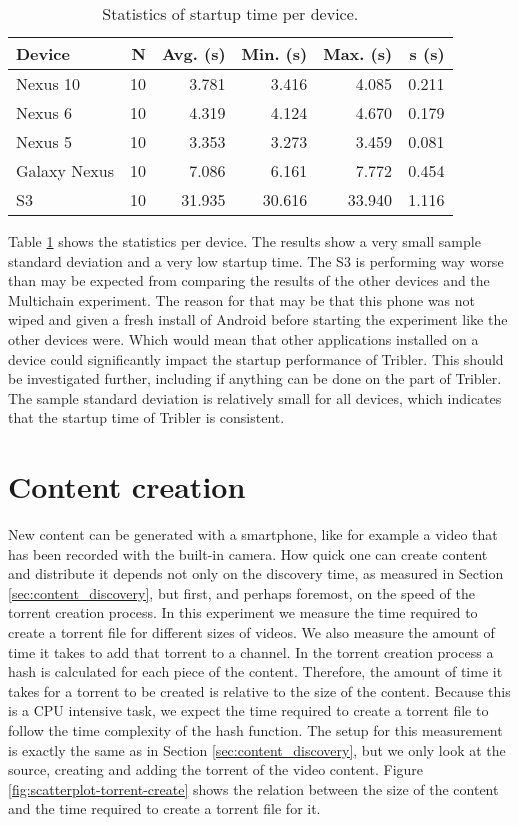 \begin{table}[H]
	\begin{tabular}{l | *{5}{r}} \hline
		Device & N & Avg. (s) & Min. (s) & Max. (s) & s (s) \\ \hline \hline
		Nexus 10        & 10 & 3.781 & 3.416 & 4.085 & 0.211 \\ \hline
		Nexus 6          & 10 & 4.319 & 4.124 & 4.670 & 0.179 \\ \hline
		Nexus 5          & 10 & 3.353 & 3.273 & 3.459 & 0.081 \\ \hline
		Galaxy Nexus & 10 & 7.086 & 6.161 & 7.772 & 0.454 \\ \hline
		S3                   & 10 & 31.935 & 30.616 & 33.940 & 1.116 \\ \hline
	\end{tabular}
	\caption{Statistics of startup time per device.}
	\label{table:startup_time}
\end{table}
Table \ref{table:startup_time} shows the statistics per device.
The results show a very small sample standard deviation and a very low startup time.
The S3 is performing way worse than may be expected from comparing the results of the other devices and the Multichain experiment.
The reason for that may be that this phone was not wiped and given a fresh install of Android before starting the experiment like the other devices were.
Which would mean that other applications installed on a device could significantly impact the startup performance of Tribler.
This should be investigated further, including if anything can be done on the part of Tribler.
The sample standard deviation is relatively small for all devices, which indicates that the startup time of Tribler is consistent.


\section{Content creation}\label{sec:content_creation}
New content can be generated with a smartphone, like for example a video that has been recorded with the built-in camera.
How quick one can create content and distribute it depends not only on the discovery time, as measured in Section \ref{sec:content_discovery}, but first, and perhaps foremost, on the speed of the torrent creation process.
In this experiment we measure the time required to create a torrent file for different sizes of videos.
We also measure the amount of time it takes to add that torrent to a channel.
In the torrent creation process a hash is calculated for each piece of the content.
Therefore, the amount of time it takes for a torrent to be created is relative to the size of the content.
Because this is a CPU intensive task, we expect the time required to create a torrent file to follow the time complexity of the hash function.
The setup for this measurement is exactly the same as in Section \ref{sec:content_discovery}, but we only look at the source, creating and adding the torrent of the video content.
Figure \ref{fig:scatterplot-torrent-create} shows the relation between the size of the content and the time required to create a torrent file for it.

